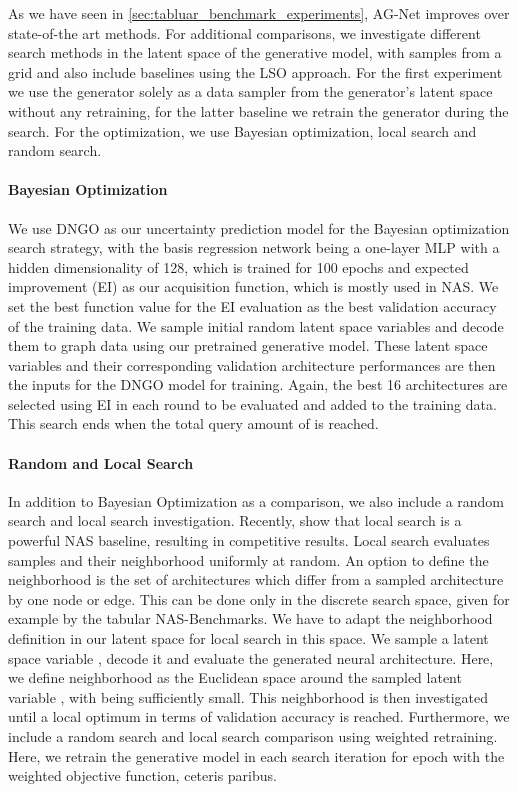 \documentclass[runningheads]{llncs}
\begin{document}
As we have seen in \autoref{sec:tabluar_benchmark_experiments}, AG-Net improves over state-of-the art methods.
For additional comparisons, we investigate different search methods in the latent space of the generative model, with samples  from a grid and also include baselines using the LSO approach. For the first experiment we use the generator solely as a data sampler from the generator's latent space without any retraining, for the latter baseline we retrain the generator during the search.
For the optimization, we use Bayesian optimization, local search and random search. 

\paragraph{Bayesian Optimization}
We use DNGO\cite{2015DNGO} as our uncertainty prediction model for the Bayesian optimization search strategy, with the basis regression network being a one-layer MLP with a hidden dimensionality of 128, which is trained for 100 epochs and expected improvement (EI) \cite{74Mockus} as our acquisition function, which is mostly used in NAS. We set the best function value for the EI evaluation as the best validation accuracy of the training data.
We sample  initial random latent space variables  and decode them to graph data using our pretrained generative model.
These latent space variables and their corresponding validation architecture performances are then the inputs for the DNGO model for training.
Again, the best 16 architectures are selected using EI in each round to be evaluated and added to the training data.
This search ends when the total query amount of  is reached.


\paragraph{Random and Local Search}
In addition to Bayesian Optimization as a comparison, we also include a random search \cite{2019RS} and local search investigation. 
Recently, \cite{2020LocalSearchNAS} show that local search is a powerful NAS baseline, resulting in competitive results.
Local search \cite{2020LocalSearchNAS} evaluates samples and their neighborhood uniformly at random.
An option to define the neighborhood is the set of architectures which differ from a sampled architecture by one node or edge.
This can be done only in the discrete search space, given for example by the tabular NAS-Benchmarks.
We have to adapt the neighborhood definition in our latent space for local search in this space.
We sample a latent space variable , decode it and evaluate the generated neural architecture.
Here, we define neighborhood as the Euclidean space around the sampled latent variable , with  being sufficiently small.
This neighborhood is then investigated until a local optimum in terms of validation accuracy is reached.
Furthermore, we include a random search and local search comparison using weighted retraining.
Here, we retrain the generative model in each search iteration for  epoch with the weighted objective function, ceteris paribus.
\end{document}
